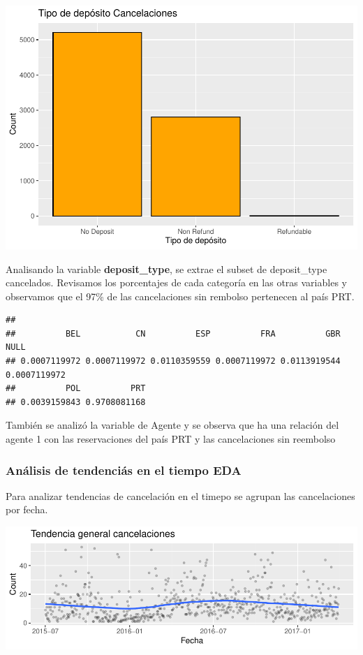 \documentclass[
]{article}
\begin{document}
\begin{center}\includegraphics{report_files/figure-latex/unnamed-chunk-7-1} \end{center}

Analisando la variable \textbf{deposit\_type}, se extrae el subset de
deposit\_type cancelados. Revisamos los porcentajes de cada categoría en
las otras variables y observamos que el 97\% de las cancelaciones sin
rembolso pertenecen al país PRT.

\begin{verbatim}
## 
##          BEL           CN          ESP          FRA          GBR         NULL 
## 0.0007119972 0.0007119972 0.0110359559 0.0007119972 0.0113919544 0.0007119972 
##          POL          PRT 
## 0.0039159843 0.9708081168
\end{verbatim}

También se analizó la variable de Agente y se observa que ha una
relación del agente 1 con las reservaciones del país PRT y las
cancelaciones sin reembolso

\hypertarget{anuxe1lisis-de-tendenciuxe1s-en-el-tiempo-eda}{%
\subsubsection{Análisis de tendenciás en el tiempo
EDA}\label{anuxe1lisis-de-tendenciuxe1s-en-el-tiempo-eda}}

Para analizar tendencias de cancelación en el timepo se agrupan las
cancelaciones por fecha.

\begin{center}\includegraphics[width=0.9\linewidth]{report_files/figure-latex/unnamed-chunk-10-1} \end{center}
\end{document}
